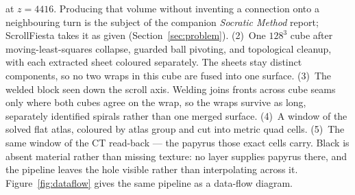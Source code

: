 \documentclass[acmtog,nonacm]{acmart}
\begin{document}
\begin{teaserfigure}
{  at $z{=}4416$. Producing that volume without inventing a connection onto
  a neighbouring turn is the subject of the companion \emph{Socratic
  Method} report; ScrollFiesta takes it as given
  (Section~\ref{sec:problem}).
  (2)~One $128^3$ cube after moving-least-squares collapse, guarded ball
  pivoting, and topological cleanup, with each extracted sheet coloured
  separately. The sheets stay distinct components, so no two wraps in this
  cube are fused into one surface. (3)~The welded block seen down the scroll axis. Welding joins
  fronts across cube seams only where both cubes agree on the wrap, so the
  wraps survive as long, separately identified spirals rather than one merged
  surface. (4)~A window of the solved flat atlas, coloured by atlas group and
  cut into metric quad cells. (5)~The same window of the CT read-back --- the
  papyrus those exact cells carry. Black is absent material rather than missing
  texture: no layer supplies papyrus there, and the pipeline leaves the hole
  visible rather than interpolating across it.
  Figure~\ref{fig:dataflow} gives the same pipeline as a data-flow diagram.}
  \label{fig:overview}
\end{teaserfigure}

\maketitle















\appendix






\end{document}
